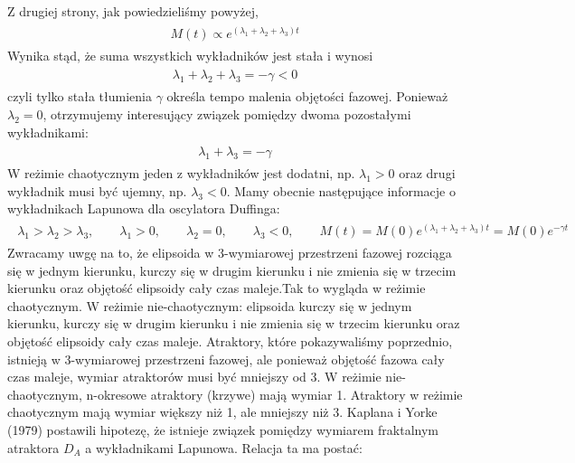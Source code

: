 \documentclass[a4paper,12pt,polish]{sphinxmanual}
\begin{document}
Z drugiej strony, jak powiedzieliśmy powyżej,
\label{ch2/chII012:equation-eqn14}\begin{gather}
\begin{split}M(t)  \propto e^{(\lambda_1 + \lambda_2 + \lambda_3) t}\end{split}\label{ch2/chII012-eqn14}
\end{gather}
Wynika stąd, że suma wszystkich wykładników jest stała i wynosi
\label{ch2/chII012:equation-eqn15}\begin{gather}
\begin{split}\lambda_1 + \lambda_2 + \lambda_3 = -\gamma  <  0\end{split}\label{ch2/chII012-eqn15}
\end{gather}
czyli tylko stała tłumienia $\gamma$ określa tempo malenia objętości fazowej.  Ponieważ $\lambda_2 =0$, otrzymujemy interesujący związek pomiędzy dwoma pozostałymi wykładnikami:
\label{ch2/chII012:equation-eqn16}\begin{gather}
\begin{split}\lambda_1 + \lambda_3 = -\gamma\end{split}\label{ch2/chII012-eqn16}
\end{gather}
W reżimie chaotycznym jeden z wykładników jest dodatni, np. $\lambda_1 >0$ oraz drugi wykładnik musi być ujemny, np. $\lambda_3 < 0$.  Mamy obecnie następujące informacje o wykładnikach Lapunowa dla oscylatora  Duffinga:
\label{ch2/chII012:equation-eqn17}\begin{gather}
\begin{split}\lambda_1  >  \lambda_2  >  \lambda_3, \qquad   \lambda_1 > 0, \qquad \lambda_2  = 0, \qquad   \lambda_3 < 0,  \qquad M(t) =  M(0)  e^{(\lambda_1 + \lambda_2 + \lambda_3) t} = M(0) e^{-\gamma t}\end{split}\label{ch2/chII012-eqn17}
\end{gather}
Zwracamy uwgę na to, że elipsoida  w 3-wymiarowej przestrzeni fazowej rozciąga się w jednym kierunku, kurczy się w drugim kierunku i nie zmienia się w trzecim kierunku  oraz objętość elipsoidy cały czas maleje.Tak to wygląda w reżimie chaotycznym. W reżimie nie-chaotycznym: elipsoida kurczy się  w jednym kierunku, kurczy się w drugim kierunku i nie zmienia się w trzecim kierunku  oraz objętość elipsoidy cały czas maleje. Atraktory, które pokazywaliśmy poprzednio, istnieją w 3-wymiarowej przestrzeni fazowej, ale ponieważ objętość fazowa cały czas maleje, wymiar atraktorów musi być mniejszy od 3. W reżimie nie-chaotycznym, n-okresowe atraktory  (krzywe) mają wymiar 1. Atraktory w reżimie chaotycznym mają wymiar większy niż 1, ale mniejszy niż 3. Kaplana i  Yorke (1979) postawili  hipotezę, że  istnieje związek pomiędzy wymiarem fraktalnym atraktora $D_A$  a wykładnikami Lapunowa. Relacja ta ma postać:
\end{document}
